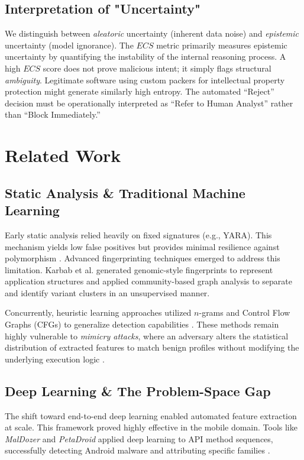 \documentclass[pdflatex,sn-mathphys-num]{sn-jnl}
\begin{document}
\subsection{Interpretation of "Uncertainty"}
We distinguish between \textit{aleatoric} uncertainty (inherent data noise) and \textit{epistemic} uncertainty (model ignorance). The $ECS$ metric primarily measures epistemic uncertainty by quantifying the instability of the internal reasoning process. A high $ECS$ score does not prove malicious intent; it simply flags structural \textit{ambiguity}. Legitimate software using custom packers for intellectual property protection might generate similarly high entropy. The automated ``Reject'' decision must be operationally interpreted as ``Refer to Human Analyst'' rather than ``Block Immediately.''



\section{Related Work}
\label{sec:related_work}

\subsection{Static Analysis \& Traditional Machine Learning}
Early static analysis relied heavily on fixed signatures (e.g., YARA). This mechanism yields low false positives but provides minimal resilience against polymorphism \cite{IdikaNwokedi2007Survey}. Advanced fingerprinting techniques emerged to address this limitation. Karbab et al. generated genomic-style fingerprints to represent application structures \cite{karbab2016Fingerprinting} and applied community-based graph analysis \cite{karbab@Cypider, karbab2025applyinggraphanalysisunsupervised} to separate and identify variant clusters in an unsupervised manner.

Concurrently, heuristic learning approaches utilized $n$-grams and Control Flow Graphs (CFGs) to generalize detection capabilities \cite{RieckKonrad2008Learning}. These methods remain highly vulnerable to \textit{mimicry attacks}, where an adversary alters the statistical distribution of extracted features to match benign profiles without modifying the underlying execution logic \cite{WagnerDavid2002Mimicry}.

\subsection{Deep Learning \& The Problem-Space Gap}
The shift toward end-to-end deep learning enabled automated feature extraction at scale. This framework proved highly effective in the mobile domain. Tools like \textit{MalDozer} \cite{karbab2018Maldozer} and \textit{PetaDroid} \cite{10.1007/978-3-030-80825-9_16} applied deep learning to API method sequences, successfully detecting Android malware and attributing specific families \cite{karbab2017Android, karbab2021android}.
\end{document}

